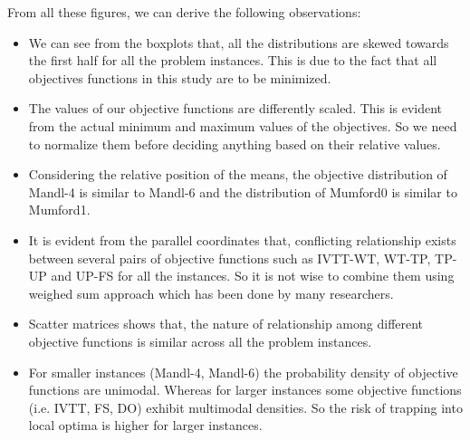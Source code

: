 From all these figures, we can derive the following observations:
\begin{itemize}
	\item We can see from the boxplots that, all the distributions are skewed towards the first half for all the problem instances. This is due to the fact that all objectives functions in this study are to be minimized.
	
	\item The values of our objective functions are differently scaled. This is evident from the actual minimum and maximum values of the objectives. So we need to normalize them before deciding anything based on their relative values. 
	
	\item Considering the relative position of the means, the objective distribution of Mandl-4 is similar to Mandl-6 and the distribution of Mumford0 is similar to Mumford1.
	
	\item It is evident from the parallel coordinates that, conflicting relationship exists between several pairs of objective functions such as IVTT-WT, WT-TP, TP-UP and UP-FS for all the instances. So it is not wise to combine them using weighed sum approach which has been done by many researchers.
	
	\item Scatter matrices shows that, the nature of relationship among different objective functions is similar across all the problem instances.
	
	\item For smaller instances (Mandl-4, Mandl-6) the probability density of objective functions are unimodal. Whereas for larger instances some objective functions (i.e. IVTT, FS, DO) exhibit multimodal densities. So the risk of trapping into local optima is higher for larger instances.
\end{itemize}
